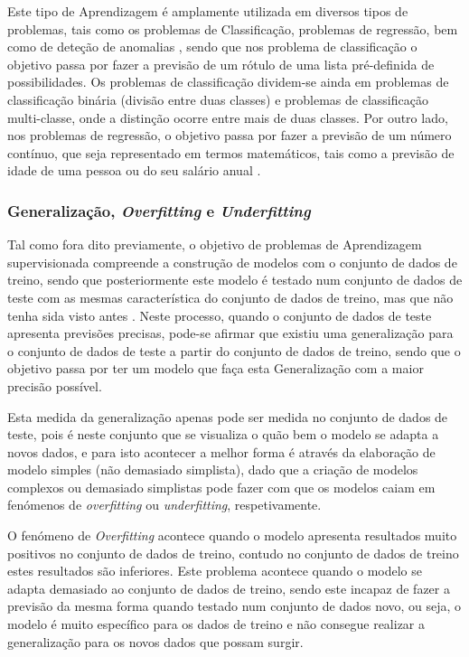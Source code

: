 \documentclass[12pt,a4paper,twoside]{report}
\begin{document}
{Este tipo de Aprendizagem é amplamente utilizada em diversos tipos de problemas, tais como os problemas de Classificação, problemas de regressão, bem como de deteção de anomalias \cite{inbook}, sendo que nos problema de classificação o objetivo passa por fazer a previsão de um rótulo de uma lista pré-definida de possibilidades. Os problemas de classificação dividem-se ainda em problemas de classificação binária (divisão entre duas classes) e problemas de classificação multi-classe, onde a distinção ocorre entre mais de duas classes. Por outro lado, nos problemas de regressão, o objetivo passa por fazer a previsão de um número contínuo, que seja representado em termos matemáticos, tais como a previsão de idade de uma pessoa ou do seu salário anual \cite{müller2016introduction}.

\subsubsection{Generalização, \textit{Overfitting} e \textit{Underfitting}}

Tal como fora dito previamente, o objetivo de problemas de Aprendizagem supervisionada compreende a construção de modelos com o conjunto de dados de treino, sendo que posteriormente este modelo é testado num conjunto de dados de teste com as mesmas característica do conjunto de dados de treino, mas que não tenha sida visto antes \cite{müller2016introduction}. Neste processo, quando o conjunto de dados de teste apresenta previsões precisas, pode-se afirmar que existiu uma generalização para o conjunto de dados de teste a partir do conjunto de dados de treino, sendo que o objetivo passa por ter um modelo que faça esta Generalização com a maior precisão possível.

Esta medida da generalização apenas pode ser medida no conjunto de dados de teste, pois é neste conjunto que se visualiza o quão bem o modelo se adapta a novos dados, e para isto acontecer a melhor forma é através da elaboração de modelo simples (não demasiado simplista), dado que a criação de modelos complexos ou demasiado simplistas pode fazer com que os modelos caiam em fenómenos de \textit{overfitting} ou \textit{underfitting}, respetivamente.

O fenómeno de \textit{Overfitting} acontece quando o modelo apresenta resultados muito positivos no conjunto de dados de treino, contudo no conjunto de dados de treino estes resultados são inferiores. Este problema acontece quando o modelo se adapta demasiado ao conjunto de dados de treino, sendo este incapaz de fazer a previsão da mesma forma quando testado num conjunto de dados novo, ou seja, o modelo é muito específico para os dados de treino e não consegue realizar a generalização para os novos dados que possam surgir.

}
\end{document}
